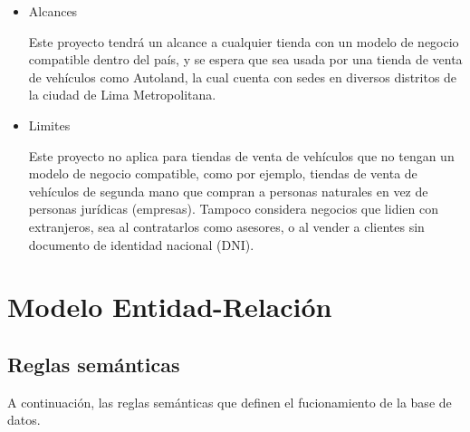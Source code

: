 \documentclass[12pt]{article}
\begin{document}
\begin{itemize}

\item Alcances

Este proyecto tendrá un alcance a cualquier tienda con un modelo de negocio compatible dentro del país, y se espera que sea usada por una tienda de venta de vehículos como Autoland, la cual cuenta con sedes en diversos distritos de la ciudad de Lima Metropolitana.

\item Limites

Este proyecto no aplica para tiendas de venta de vehículos que no tengan un modelo de negocio compatible, como por ejemplo, tiendas de venta de vehículos de segunda mano que compran a personas naturales en vez de personas jurídicas (empresas). Tampoco considera negocios que lidien con extranjeros, sea al contratarlos como asesores, o al vender a clientes sin documento de identidad nacional (DNI).


\end{itemize}


\section{Modelo Entidad-Relaci\'on}

\subsection{Reglas sem\'anticas}

A continuación, las reglas semánticas que definen el fucionamiento de la base de datos.
\end{document}
